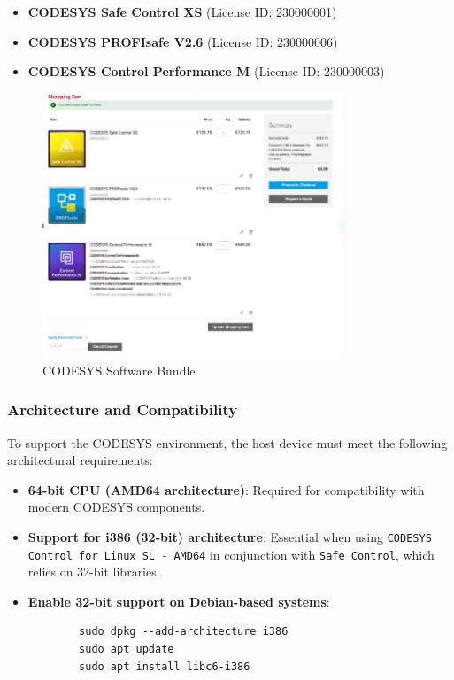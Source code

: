 \documentclass[a4paper,12pt]{article}
\begin{document}
\begin{itemize}
	\item \textbf{CODESYS Safe Control XS} (License ID: 230000001)
	\item \textbf{CODESYS PROFIsafe V2.6} (License ID: 230000006)
	\item \textbf{CODESYS Control Performance M} (License ID: 230000003)
\end{itemize}

\begin{figure}[H]
	\centering
	\includegraphics[width=0.8\textwidth]{28.jpg}
	\caption{CODESYS Software Bundle}
	\label{fig:codesys_bundle}
\end{figure}

\subsubsection{Architecture and Compatibility}
To support the CODESYS environment, the host device must meet the following architectural requirements:

\begin{itemize}
	\item \textbf{64-bit CPU (AMD64 architecture)}: Required for compatibility with modern CODESYS components.
	\item \textbf{Support for i386 (32-bit) architecture}: Essential when using \texttt{CODESYS Control for Linux SL - AMD64} in conjunction with \texttt{Safe Control}, which relies on 32-bit libraries.
	\item \textbf{Enable 32-bit support on Debian-based systems}:
	\begin{lstlisting}
		sudo dpkg --add-architecture i386
		sudo apt update
		sudo apt install libc6-i386
	\end{lstlisting}
\end{itemize}
\end{document}
